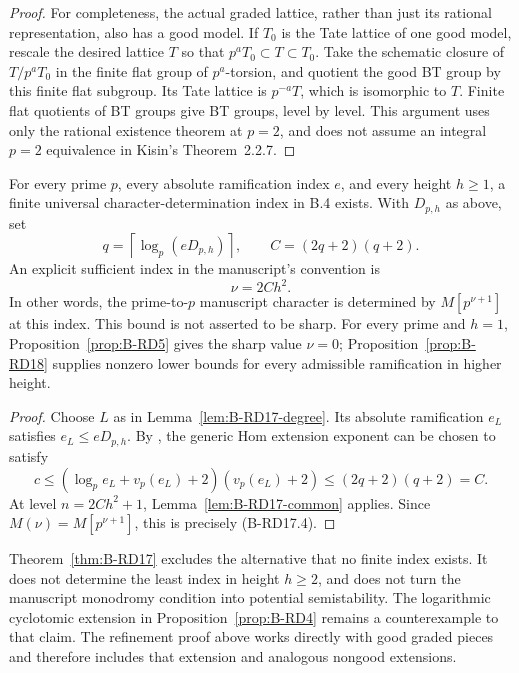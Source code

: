 \begin{proof}
For completeness, the actual graded lattice, rather than just its
rational representation, also has a good model. If $T_0$ is the Tate
lattice of one good model, rescale the desired lattice $T$ so that
$p^aT_0\subset T\subset T_0$. Take the schematic closure of
$T/p^aT_0$ in the finite flat group of $p^a$-torsion, and quotient the
good BT group by this finite flat subgroup. Its Tate lattice is
$p^{-a}T$, which is isomorphic to $T$. Finite flat quotients of BT
groups give BT groups, level by level. This argument uses only the
rational existence theorem at $p=2$, and does not assume an integral
$p=2$ equivalence in Kisin's Theorem~2.2.7.
\end{proof}

\begin{theorem}
\label{thm:B-RD17}
For every prime $p$, every absolute ramification index $e$, and every
height $h\geq1$, a finite universal character-determination index in
B.4 exists. With $D_{p,h}$ as above, set
\[
 q=\left\lceil\log_p(eD_{p,h})\right\rceil,
 \qquad C=(2q+2)(q+2).
\]
An explicit sufficient index in the manuscript's convention is
\[
                       \nu=2Ch^2.                    \tag{B-RD17.4}
\]
In other words, the prime-to-$p$ manuscript character is determined
by $M[p^{\nu+1}]$ at this index. This bound is not asserted to be
sharp. For every prime and $h=1$, Proposition~\ref{prop:B-RD5} gives
the sharp value $\nu=0$; Proposition~\ref{prop:B-RD18} supplies
nonzero lower bounds for every admissible ramification in higher
height.
\end{theorem}
\begin{proof}
Choose $L$ as in Lemma~\ref{lem:B-RD17-degree}. Its absolute
ramification $e_L$ satisfies $e_L\leq eD_{p,h}$.
By \cite[Corollary~2 and the bound following Theorem~1, p.2 of the
author version]{VasiuZink2012Boundedness}, the generic Hom extension
exponent can be chosen to satisfy
\[
 c\leq(\log_p e_L+v_p(e_L)+2)(v_p(e_L)+2)
       \leq(2q+2)(q+2)=C.
\]
At level $n=2Ch^2+1$, Lemma~\ref{lem:B-RD17-common} applies.
Since $M(\nu)=M[p^{\nu+1}]$, this is precisely (B-RD17.4).
\end{proof}

\begin{remark}\label{auto:B:5338697ffdba}

Theorem~\ref{thm:B-RD17} excludes the alternative that no finite
index exists. It does not determine the least index in height
$h\geq2$, and does not turn the manuscript monodromy condition into
potential semistability. The logarithmic cyclotomic extension in
Proposition~\ref{prop:B-RD4} remains a counterexample to that claim.
The refinement proof above works directly with good graded pieces
and therefore includes that extension and analogous nongood
extensions.
\end{remark}



